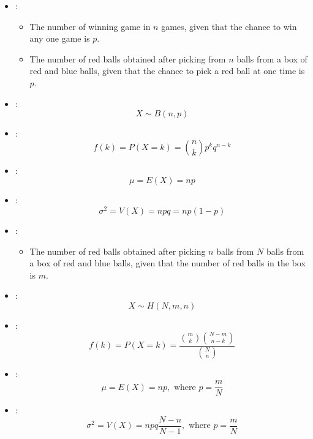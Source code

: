 \begin{multicols*}{3}


    \begin{itemize}
      \item {}:
        \begin{itemize}
          \item The number of winning game in $n$ games, given that the chance to win any one game is $p$.
          \item The number of red balls obtained after picking  from $n$ balls from a box of red and blue balls, given that the chance to pick a red ball at one time is $p$.
        \end{itemize}
      \item {}:
        \[
          X \sim B(n, p)
        \]
      \item {}:
        \[
          f(k) = P(X = k) = {n \choose k} p^k q^{n - k}
        \]
      \item {}:
        \[
          \mu = E(X) = np
        \]
      \item {}:
        \[
          \sigma^2 = V(X) = npq = np(1 - p)
        \]
    \end{itemize}

    \begin{itemize}
      \item {}:
        \begin{itemize}
          \item The number of red balls obtained after picking  $n$ balls from $N$ balls from a box of red and blue balls, given that the number of red balls in the box is $m$.
        \end{itemize}
      \item {}:
        \[
          X \sim H(N, m, n)
        \]
      \item {}:
        \[
          f(k) = P(X = k) = \dfrac{{m \choose k} {N - m \choose n - k}}{{N \choose n}}
        \]
      \item {}:
        \[
          \mu = E(X) = np, \text{ where } p = \frac{m}{N}
        \]
      \item {}:
        \[
          \sigma^2 = V(X) = npq \frac{N - n}{N - 1}, \text{ where } p = \frac{m}{N}
        \]
    \end{itemize}


\end{multicols*}
